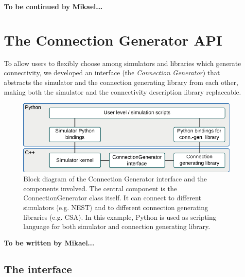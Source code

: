 \documentclass{frontiersSCNS} %
\newcommand{\tbw}[1]{{\bf\parindent0pt\color{red}#1}}
\begin{document}
\tbw{To be continued by Mikael...}


\section{The Connection Generator API}

To allow users to flexibly choose among simulators and libraries
which generate connectivity, we developed an interface (the
\emph{Connection Generator}) that abstracts the simulator and the
connection generating library from each other, making both the
simulator and the connectivity description library replaceable.

\begin{figure}[ht]
\centering
\includegraphics[scale=.8]{figures/block_diagram_conngen.pdf}
\caption{Block diagram of the Connection Generator interface and the
  components involved. The central component is the
  ConnectionGenerator class itself. It can connect to different simulators
  (e.g. NEST) and to different connection generating libraries
  (e.g. CSA). In this example, Python is used as scripting language
  for both simulator and connection generating
  library.}\label{fig:block_diagram_conngen}
\end{figure}

\tbw{To be written by Mikael...}

\subsection{The interface}\label{sec:cgint}
\end{document}
